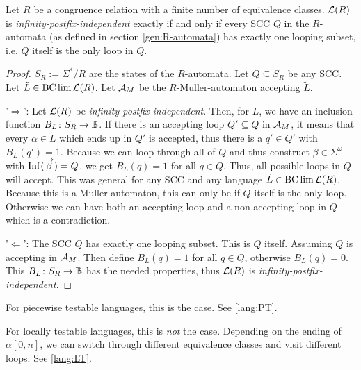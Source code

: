\begin{lemma}
\label{gen:infPostfixIndep-AutLoops}
Let $R$ be a congruence relation with a finite number of equivalence classes. $\mathcal{L}(R)$ is \emph{infinity-postfix-independent} exactly if and only if every SCC $Q$ in the $R$-automata (as defined in section \ref{gen:R-automata}) has exactly one looping subset, i.e. $Q$ itself is the only loop in $Q$.
\begin{proof}
$S_R := \Sigma^*/R$ are the states of the $R$-automata. Let $Q \subseteq S_R$ be any SCC. Let $\tilde L \in \operatorname{BC} \lim \mathcal{L}(R)$. Let $\mathcal{A}_M$ be the $R$-Muller-automaton accepting $\tilde L$.

'$\Rightarrow$': Let $\mathcal{L}(R)$ be \emph{infinity-postfix-independent}. Then, for $L$, we have an inclusion function $B_L \colon S_R \rightarrow \mathbb{B}$. If there is an accepting loop $Q' \subseteq Q$ in $\mathcal{A}_M$, it means that every $\alpha \in \tilde L$ which ends up in $Q'$ is accepted, thus there is a $q' \in Q'$ with $B_L(q') = 1$. Because we can loop through all of $Q$ and thus construct $\beta \in \Sigma^\omega$ with $\operatorname{Inf}(\overrightarrow \beta) = Q$, we get $B_L(q) = 1$ for all $q \in Q$. Thus, all possible loops in $Q$ will accept. This was general for any SCC and any language $\tilde L \in \operatorname{BC} \lim \mathcal{L}(R)$. Because this is a Muller-automaton, this can only be if $Q$ itself is the only loop. Otherwise we can have both an accepting loop and a non-accepting loop in $Q$ which is a contradiction.

'$\Leftarrow$': The SCC $Q$ has exactly one looping subset. This is $Q$ itself. Assuming $Q$ is accepting in $\mathcal{A}_M$. Then define $B_L(q) = 1$ for all $q \in Q$, otherwise $B_L(q) = 0$. This $B_L \colon S_R \rightarrow \mathbb{B}$ has the needed properties, thus $\mathcal{L}(R)$ is \emph{infinity-postfix-independent}.
\end{proof}
\end{lemma}

For piecewise testable languages, this is the case. See \cref{lang:PT}.

For locally testable languages, this is \emph{not} the case. Depending on the ending of $\alpha[0,n]$, we can switch through different equivalence classes and visit different loops. See \cref{lang:LT}.

